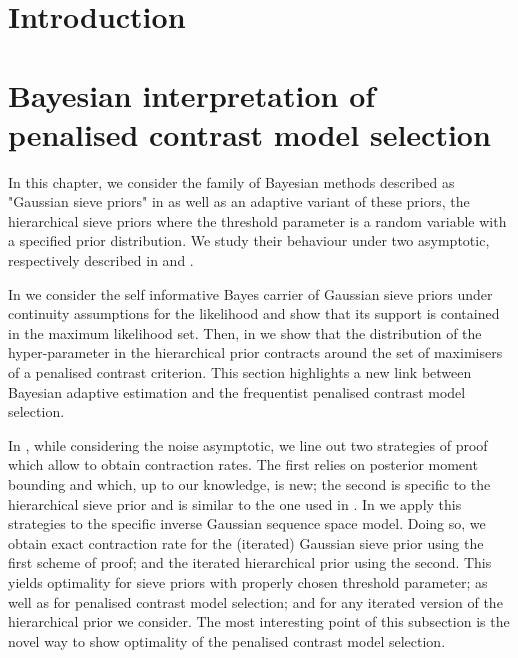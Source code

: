 \documentclass[a4paper,11pt]{book}
\begin{document}
\frontmatter

%
\tableofcontents
%
%
\mainmatter

\pagestyle{fancy}
\chapter{Introduction}\label{INTRO}






\chapter{Bayesian interpretation of penalised contrast model selection}\label{BAYES}

In this chapter, we consider the family of Bayesian methods described as "Gaussian sieve priors" in  as well as an adaptive variant of these priors, the hierarchical sieve priors where the threshold parameter is a random variable with a specified prior distribution.
We study their behaviour under two asymptotic, respectively described in  and .

In  we consider the self informative Bayes carrier of Gaussian sieve priors under continuity assumptions for the likelihood and show that its support is contained in the maximum likelihood set.
Then, in  we show that the distribution of the hyper-parameter in the hierarchical prior contracts around the set of maximisers of a penalised contrast criterion.
This section highlights a new link between Bayesian adaptive estimation and the frequentist penalised contrast model selection.

\medskip

In , while considering the noise asymptotic, we line out two strategies of proof which allow to obtain contraction rates. The first relies on posterior moment bounding and which, up to our knowledge, is new; the second is specific to the hierarchical sieve prior and is similar to the one used in .
In  we apply this strategies to the specific inverse Gaussian sequence space model.
Doing so, we obtain exact contraction rate for the (iterated) Gaussian sieve prior using the first scheme of proof; and the iterated hierarchical prior using the second.
This yields optimality for sieve priors with properly chosen threshold parameter; as well as for penalised contrast model selection; and for any iterated version of the hierarchical prior we consider.
The most interesting point of this subsection is the novel way to show optimality of the penalised contrast model selection.
\end{document}
